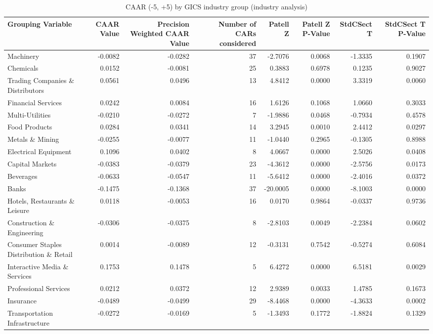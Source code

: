 \begin{table}
\caption{CAAR (-5, +5) by GICS industry group (industry analysis)}
\label{tab:industry_caar}
\begin{tabular}{lrrrrrrr}
\toprule
Grouping Variable & CAAR Value & Precision Weighted CAAR Value & Number of CARs considered & Patell Z & Patell Z P-Value & StdCSect T & StdCSect T P-Value \\
\midrule
Machinery & -0.0082 & -0.0282 & 37 & -2.7076 & 0.0068 & -1.3335 & 0.1907 \\
Chemicals & 0.0152 & -0.0081 & 25 & 0.3883 & 0.6978 & 0.1235 & 0.9027 \\
Trading Companies \& Distributors & 0.0561 & 0.0496 & 13 & 4.8412 & 0.0000 & 3.3319 & 0.0060 \\
Financial Services & 0.0242 & 0.0084 & 16 & 1.6126 & 0.1068 & 1.0660 & 0.3033 \\
Multi-Utilities & -0.0210 & -0.0272 & 7 & -1.9886 & 0.0468 & -0.7934 & 0.4578 \\
Food Products & 0.0284 & 0.0341 & 14 & 3.2945 & 0.0010 & 2.4412 & 0.0297 \\
Metals \& Mining & -0.0255 & -0.0077 & 11 & -1.0440 & 0.2965 & -0.1305 & 0.8988 \\
Electrical Equipment & 0.1096 & 0.0402 & 8 & 4.0667 & 0.0000 & 2.5026 & 0.0408 \\
Capital Markets & -0.0383 & -0.0379 & 23 & -4.3612 & 0.0000 & -2.5756 & 0.0173 \\
Beverages & -0.0633 & -0.0547 & 11 & -5.6412 & 0.0000 & -2.4016 & 0.0372 \\
Banks & -0.1475 & -0.1368 & 37 & -20.0005 & 0.0000 & -8.1003 & 0.0000 \\
Hotels, Restaurants \& Leisure & 0.0118 & -0.0053 & 16 & 0.0170 & 0.9864 & -0.0337 & 0.9736 \\
Construction \& Engineering & -0.0306 & -0.0375 & 8 & -2.8103 & 0.0049 & -2.2384 & 0.0602 \\
Consumer Staples Distribution \& Retail & 0.0014 & -0.0089 & 12 & -0.3131 & 0.7542 & -0.5274 & 0.6084 \\
Interactive Media \& Services & 0.1753 & 0.1478 & 5 & 6.4272 & 0.0000 & 6.5181 & 0.0029 \\
Professional Services & 0.0212 & 0.0372 & 12 & 2.9389 & 0.0033 & 1.4785 & 0.1673 \\
Insurance & -0.0489 & -0.0499 & 29 & -8.4468 & 0.0000 & -4.3633 & 0.0002 \\
Transportation Infrastructure & -0.0272 & -0.0169 & 5 & -1.3493 & 0.1772 & -1.8824 & 0.1329 \\

\end{tabular}
\end{table}
